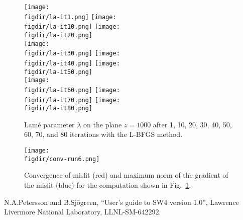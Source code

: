 \documentclass[12pt]{article}
\def\figdir{mfigs}
\begin{document}
\begin{figure}
\begin{center}
\texttt{[image: \\figdir/la-it1.png]}\hfil
\texttt{[image: \\figdir/la-it10.png]}\hfil
\texttt{[image: \\figdir/la-it20.png]} \\
\texttt{[image: \\figdir/la-it30.png]}\hfil
\texttt{[image: \\figdir/la-it40.png]}\hfil
\texttt{[image: \\figdir/la-it50.png]} \\
\texttt{[image: \\figdir/la-it60.png]}\hfil
\texttt{[image: \\figdir/la-it70.png]}\hfil
\texttt{[image: \\figdir/la-it80.png]} \\
\caption{Lam\'e parameter $\lambda$ on the plane $z=1000$ after 1, 10, 20, 30, 40, 50, 60, 70, and 80 iterations
with the L-BFGS method.}
\label{fig:1}
\end{center}
\end{figure}

\begin{figure}
\begin{center}
\texttt{[image: \\figdir/conv-run6.png]}\hfil
\caption{Convergence of misfit (red) and maximum norm of the gradient of the misfit (blue) for 
the computation shown in Fig.~\ref{fig:1}.}
\label{fig:2}
\end{center}
\end{figure}

\begin{thebibliography}{99}
 N.A.Petersson and B.Sj\"ogreen, ``User's guide to SW4 version 1.0'', Lawrence Livermore National
Laboratory, LLNL-SM-642292.
\end{thebibliography}
\end{document}
